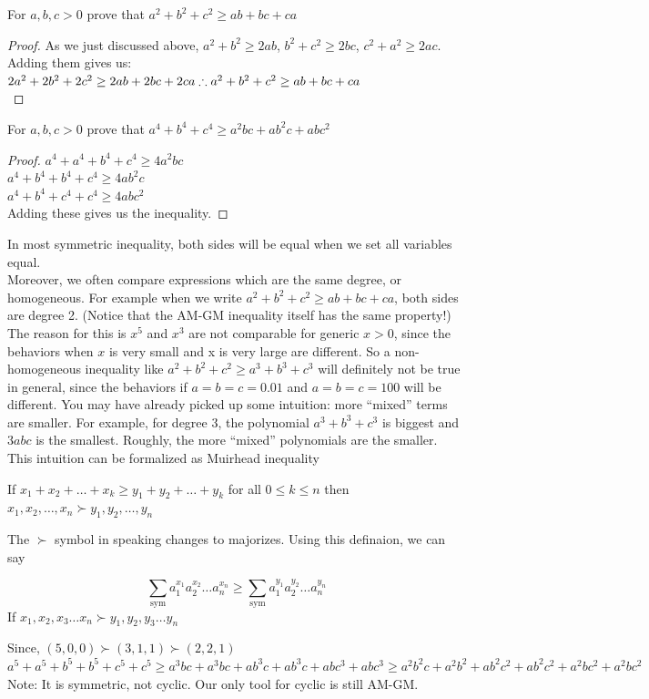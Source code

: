 \begin{example}
    For $a, b, c > 0$ prove that $a^2+b^2+c^2 \geq ab + bc + ca$
\end{example}
\begin{proof}
    As we just discussed above, $a^2+b^2 \geq 2ab$, $b^2+c^2 \geq 2bc$, $c^2+a^2 \geq 2ac$. Adding them gives us:\\
    $2a^2+2b^2+2c^2 \geq 2ab+2bc+2ca\\
    \therefore a^2+b^2+c^2 \geq ab+bc+ca$\\
\end{proof}
\begin{example}
    For $a, b, c > 0$ prove that $a^4+b^4+c^4 \geq a^2bc+ab^2c+abc^2$
\end{example}
\begin{proof}
    $a^4+a^4+b^4+c^4 \geq 4a^2bc$\\
    $a^4+b^4+b^4+c^4 \geq 4ab^2c$\\
    $a^4+b^4+c^4+c^4 \geq 4abc^2$\\
    Adding these gives us the inequality.
\end{proof}
In most symmetric inequality, both sides will be equal when
we set all variables equal.\\
Moreover, we often compare expressions which are the same degree, or homogeneous. For example when we write $a^2 + b^2 + c^2 \geq ab + bc + ca$, both sides are degree 2. (Notice that the AM-GM inequality itself has the same property!) \\
The reason for this is $x^5$ and $x^3$ are not comparable for generic $x > 0$, since the behaviors when $x$ is very small and x is very large are different. So a non-homogeneous inequality like $a^2+b^2+c^2 \geq a^3+b^3+c^3$ will definitely not be true in general, since the behaviors if $a=b=c=0.01$ and $a=b=c=100$ will be different. You may have already picked up some intuition: more “mixed” terms are smaller. For example, for degree 3, the polynomial $a^3 +b^3 +c^3$ is biggest and $3abc$ is the smallest. Roughly, the more “mixed” polynomials are the smaller.\\
This intuition can be formalized as Muirhead inequality\\
\begin{definition}
     If $x_1+x_2+\dots + x_k \geq y_1 + y_2+ \dots + y_k$ for all $0\leq k \leq n$ then ${x_1,x_2,\dots,x_n} \succ {y_1,y_2,\dots,y_n}$
\end{definition}
The $\succ$ symbol in speaking changes to majorizes. Using this definaion, we can say
   \begin{theorem}
   [Muirhead]
    \[\sum_{\text{sym}}a_1^{x_1}a_2^{x_2}\dots a_n^{x_n} \geq \sum_{\text{sym}}a_1^{y_1}a_2^{y_2}\dots a_n^{y_n}\]
    If $x_1,x_2,x_3 \dots x_n \succ y_1,y_2,y_3 \dots y_n$
\end{theorem}
Since, $(5,0,0)\succ(3,1,1)\succ(2,2,1)$\\
$a^5+a^5+b^5+b^5+c^5+c^5 \geq a^3bc+a^3bc+ab^3c+ab^3c+abc^3+abc^3 \geq a^2b^2c+a^2b^2+ab^2c^2+ab^2c^2+a^2bc^2+a^2bc^2$\\
Note: It is symmetric, not cyclic. Our only tool for cyclic is still AM-GM.\\
